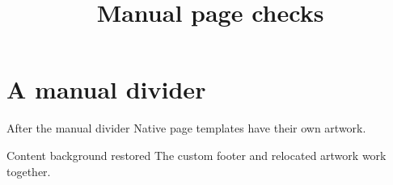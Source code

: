 \documentclass[aspectratio=169,11pt,t]{beamer}
\title[Manual pages]{Manual page checks}
\author{}
\date{}
\begin{document}
\begin{frame}
  \titlepage
\end{frame}
\section{A manual divider}
\begin{frame}
  \sectionpage
\end{frame}
\begin{frame}{After the manual divider}
  Native page templates have their own artwork.
\end{frame}
\begin{frame}{Content background restored}
  The custom footer and relocated artwork work together.
\end{frame}
\end{document}
